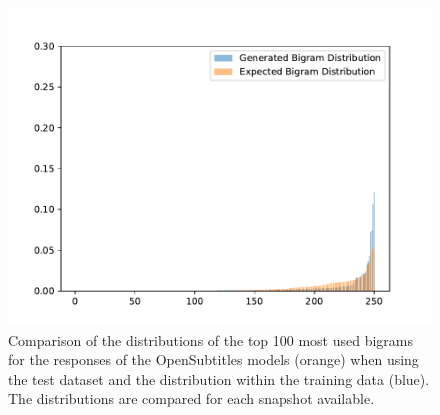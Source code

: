\begin{figure}[H]
	\centering
	\small
	\endminipage\hfill
	\includegraphics[width=\linewidth]{img/plots/opensubtitles_not_reversed/bigram_distribution_comparison_step_3000000.pdf}
	\centering
	\small
	\endminipage\hfill
	\caption{Comparison of the distributions of the top 100 most used bigrams for the responses of the OpenSubtitles models (orange) when using the test dataset and the distribution within the training data (blue). The distributions are compared for each snapshot available.}
	\label{results:bigram:distributions:opensubtitles}
\end{figure}

